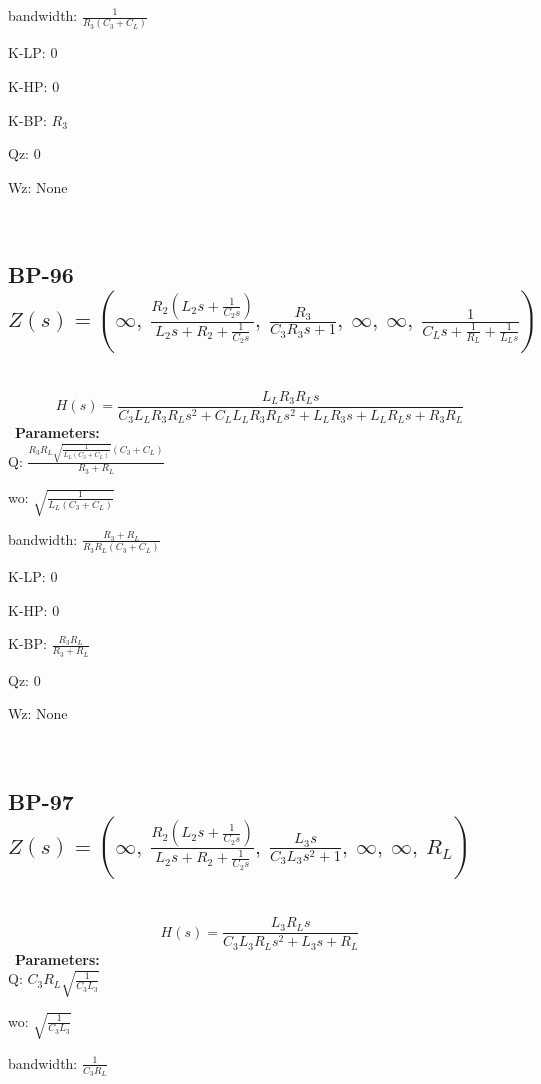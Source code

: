 \documentclass{article}
\begin{document}
bandwidth: $\frac{1}{R_{3} \left(C_{3} + C_{L}\right)}$\ 

K-LP: $0$\ 

K-HP: $0$\ 

K-BP: $R_{3}$\ 

Qz: $0$\ 

Wz: $\text{None}$\ 

\ 

\subsection{BP-96 $Z(s) = \left( \infty, \  \frac{R_{2} \left(L_{2} s + \frac{1}{C_{2} s}\right)}{L_{2} s + R_{2} + \frac{1}{C_{2} s}}, \  \frac{R_{3}}{C_{3} R_{3} s + 1}, \  \infty, \  \infty, \  \frac{1}{C_{L} s + \frac{1}{R_{L}} + \frac{1}{L_{L} s}}\right)$ } \ 
\textbf{\[H(s) = \frac{L_{L} R_{3} R_{L} s}{C_{3} L_{L} R_{3} R_{L} s^{2} + C_{L} L_{L} R_{3} R_{L} s^{2} + L_{L} R_{3} s + L_{L} R_{L} s + R_{3} R_{L}}\] } \ 
\textbf{Parameters:}\\ 

Q: $\frac{R_{3} R_{L} \sqrt{\frac{1}{L_{L} \left(C_{3} + C_{L}\right)}} \left(C_{3} + C_{L}\right)}{R_{3} + R_{L}}$\ 

wo: $\sqrt{\frac{1}{L_{L} \left(C_{3} + C_{L}\right)}}$\ 

bandwidth: $\frac{R_{3} + R_{L}}{R_{3} R_{L} \left(C_{3} + C_{L}\right)}$\ 

K-LP: $0$\ 

K-HP: $0$\ 

K-BP: $\frac{R_{3} R_{L}}{R_{3} + R_{L}}$\ 

Qz: $0$\ 

Wz: $\text{None}$\ 

\ 

\subsection{BP-97 $Z(s) = \left( \infty, \  \frac{R_{2} \left(L_{2} s + \frac{1}{C_{2} s}\right)}{L_{2} s + R_{2} + \frac{1}{C_{2} s}}, \  \frac{L_{3} s}{C_{3} L_{3} s^{2} + 1}, \  \infty, \  \infty, \  R_{L}\right)$ } \ 
\textbf{\[H(s) = \frac{L_{3} R_{L} s}{C_{3} L_{3} R_{L} s^{2} + L_{3} s + R_{L}}\] } \ 
\textbf{Parameters:}\\ 

Q: $C_{3} R_{L} \sqrt{\frac{1}{C_{3} L_{3}}}$\ 

wo: $\sqrt{\frac{1}{C_{3} L_{3}}}$\ 

bandwidth: $\frac{1}{C_{3} R_{L}}$\ 
\end{document}

